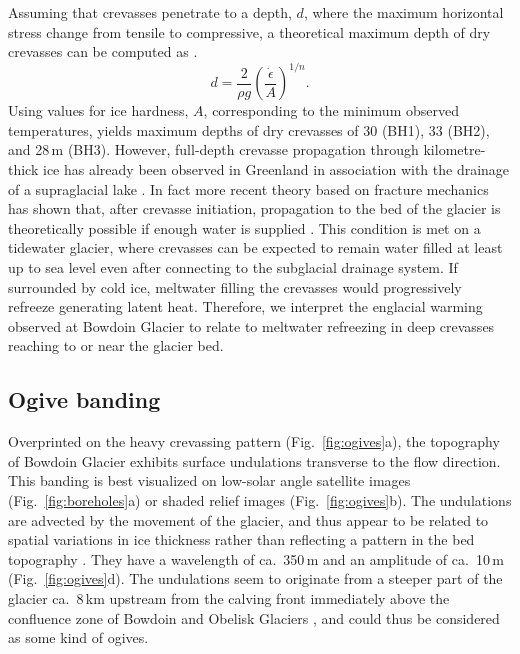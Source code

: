 \documentclass[utf8]{article}
\begin{document}
    Assuming that crevasses penetrate to a depth, $d$, where the maximum
    horizontal stress change from tensile to compressive, a theoretical maximum
    depth of dry crevasses can be computed as \citep[p.~449]{Nye.1955,
    Cuffey.Paterson.2010}.
    \begin{equation}
        d=\frac{2}{\rho g}(\frac{\dot\epsilon}{A})^{1/n}.
    \end{equation}
    Using values for ice hardness, $A$, corresponding to the minimum observed
    temperatures, yields maximum depths of dry crevasses of 30 (BH1), 33 (BH2),
    and 28\,m (BH3). However, full-depth crevasse propagation through
    kilometre-thick ice has already been observed in Greenland in association
    with the drainage of a supraglacial
    lake \citep{Das.etal.2008}. In fact more recent theory based on fracture
    mechanics has shown that, after crevasse initiation, propagation
    to the bed of the glacier is theoretically possible if enough water is
    supplied \citep{Veen.2007}. This condition is met on a tidewater glacier,
    where crevasses can be expected to remain water filled at least up to sea
    level even after connecting to the subglacial drainage system. If
    surrounded by cold ice, meltwater filling the crevasses would progressively
    refreeze generating latent heat. Therefore, we interpret the englacial
    warming observed at Bowdoin Glacier to relate to meltwater refreezing in
    deep crevasses reaching to or near the glacier bed.


\subsection{Ogive banding}

    Overprinted on the heavy crevassing pattern (Fig.~\ref{fig:ogives}a), the
    topography of Bowdoin Glacier exhibits surface undulations transverse to
    the flow direction. This banding is best visualized on low-solar angle
    satellite images (Fig.~\ref{fig:boreholes}a) or shaded relief images
    (Fig.~\ref{fig:ogives}b). The undulations are advected by the movement of
    the glacier, and thus appear to be related to spatial variations in
    ice thickness rather than reflecting a pattern in the bed topography
    \citep[Fig.~\ref{fig:ogives}c; Fig.~3 of][]{Tsutaki.etal.2016}. They have a
    wavelength of ca.~350\,m and an amplitude of ca.~10\,m
    (Fig.~\ref{fig:ogives}d). The undulations seem to originate from a
    steeper part of the glacier ca.~8\,km upstream from the calving front
    immediately above the confluence zone of Bowdoin and Obelisk Glaciers
    \citep[Fig.~\ref{fig:images}a; Fig.~3 of ][]{Tsutaki.etal.2016}, and
    could thus be considered as some kind of ogives.
\end{document}
